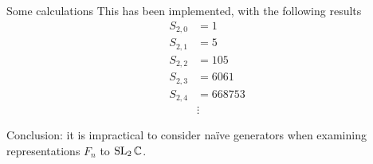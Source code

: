 \begin{frame}{Some calculations}
  This has been implemented, with the following results
  \begin{align*}
    S_{2,0} &= 1 \\
    S_{2,1} &= 5 \\
    S_{2,2} &= 105 \\
    S_{2,3} &= 6061 \\
    S_{2,4} &= 668753 \\
    &\vdots
  \end{align*}

  Conclusion: it is impractical to consider naïve generators when examining
  representations $F_n$ to $\operatorname{SL}_2\mathbb{C}$.
\end{frame}

